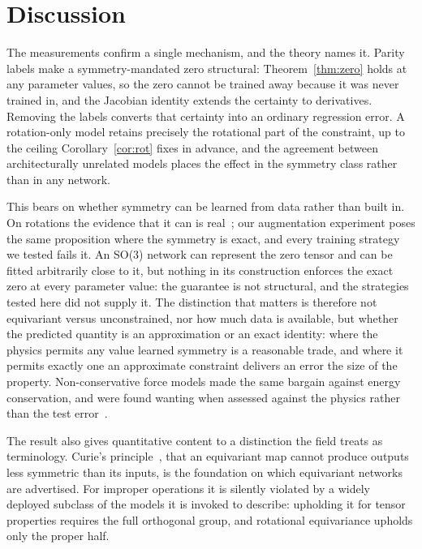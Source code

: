 \section*{Discussion}

The measurements confirm a single mechanism, and the theory names it. Parity labels make a symmetry-mandated zero structural: Theorem~\ref{thm:zero} holds at any parameter values, so the zero cannot be trained away because it was never trained in, and the Jacobian identity extends the certainty to derivatives. Removing the labels converts that certainty into an ordinary regression error. A rotation-only model retains precisely the rotational part of the constraint, up to the ceiling Corollary~\ref{cor:rot} fixes in advance, and the agreement between architecturally unrelated models places the effect in the symmetry class rather than in any network.

This bears on whether symmetry can be learned from data rather than built in. On rotations the evidence that it can is real~\cite{brehmer2024scale,bigi2026unconstrained}; our augmentation experiment poses the same proposition where the symmetry is exact, and every training strategy we tested fails it. An SO(3) network can represent the zero tensor and can be fitted arbitrarily close to it, but nothing in its construction enforces the exact zero at every parameter value: the guarantee is not structural, and the strategies tested here did not supply it. The distinction that matters is therefore not equivariant versus unconstrained, nor how much data is available, but whether the predicted quantity is an approximation or an exact identity: where the physics permits any value learned symmetry is a reasonable trade, and where it permits exactly one an approximate constraint delivers an error the size of the property. Non-conservative force models made the same bargain against energy conservation, and were found wanting when assessed against the physics rather than the test error~\cite{bigi2025forces}.

The result also gives quantitative content to a distinction the field treats as terminology. Curie's principle~\cite{curie1894symmetry}, that an equivariant map cannot produce outputs less symmetric than its inputs, is the foundation on which equivariant networks are advertised. For improper operations it is silently violated by a widely deployed subclass of the models it is invoked to describe: upholding it for tensor properties requires the full orthogonal group, and rotational equivariance upholds only the proper half.

